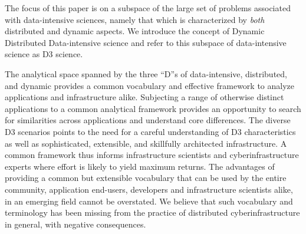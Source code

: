 The focus of this paper is on a subspace of the large set of problems associated
with data-intensive sciences, namely that which is characterized by {\it both}
distributed and dynamic aspects. We introduce the concept of Dynamic Distributed
Data-intensive science and refer to this subspace of data-intensive science as
D3 science.  


The analytical space spanned by the three ``D''s of data-intensive, distributed,
and dynamic provides a common vocabulary and effective framework to analyze
applications and infrastructure alike.  Subjecting a range of otherwise distinct
applications to a common analytical framework provides an opportunity to search
for similarities across applications and understand core differences.  The
diverse D3 scenarios points to the need for a careful understanding of D3
characteristics as well as sophisticated, extensible, and skillfully architected
infrastructure.  A common framework thus informs infrastructure scientists and
cyberinfrastructure experts where effort is likely to yield maximum returns.
The advantages of providing a common but extensible vocabulary that can be used
by the entire community, application end-users, developers and infrastructure
scientists alike, in an emerging field cannot be overstated. We believe that
such vocabulary and terminology has been missing from the practice of
distributed cyberinfrastructure in general, with negative consequences.
 








